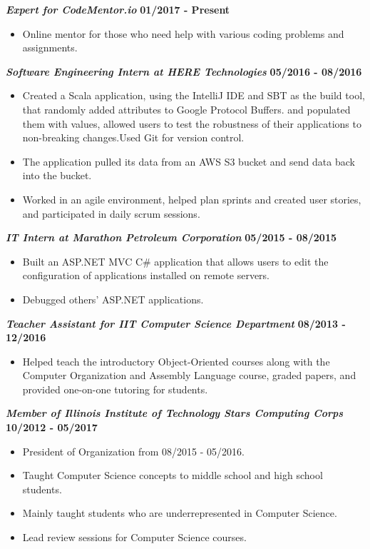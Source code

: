 \documentclass[10pt]{res}
\begin{document}
\begin{resume}
\textbf{\textit{Expert for CodeMentor.io}}
	\vspace*{.25em}
	\hfill{\bf 01/2017 - Present}
	\begin{itemize}
		\item Online mentor for those who need help with various coding problems and assignments. 
	\end{itemize}
	
	\textbf{\textit{Software Engineering Intern at HERE Technologies}}
	\vspace*{.25em}
	\hfill {\bf 05/2016 - 08/2016}
	\begin{itemize}
	  \item Created a Scala application, using the IntelliJ IDE and SBT as the build tool, that randomly added attributes to Google Protocol Buffers. 
 and populated them with values, allowed users to test the robustness of their applications to non-breaking changes.Used Git for version control. 
	\item The application pulled its data from an AWS S3 bucket and send data back into the bucket.
\item Worked in an agile environment, helped plan sprints and created user stories, and participated in daily scrum sessions. 
	\end{itemize}  
	\textbf{\textit{IT Intern at Marathon Petroleum Corporation}} \hfill {\bf 05/2015 - 08/2015}
	\vspace*{.25em}
	\begin{itemize}
  \setlength\itemsep{0em}
	  \item Built an ASP.NET MVC C\# application that allows users to edit the configuration of applications installed on remote servers.
	  \item Debugged others' ASP.NET applications.
\end{itemize}

	\textbf{\textit{Teacher Assistant for IIT Computer Science Department}} 
	\vspace*{.25em}
	\hfill {\bf 08/2013 - 12/2016}
	\begin{itemize}
	  \item Helped teach the introductory Object-Oriented courses along with the Computer Organization and Assembly Language course, graded papers, and provided one-on-one tutoring for students. 
	\end{itemize}
	
	\textbf{\textit{Member of Illinois Institute of Technology Stars Computing Corps}}
	\vspace*{.25em}
	\hfill {\bf 10/2012 - 05/2017}
	\begin{itemize}
  \setlength\itemsep{0em}
	  \item President of Organization from 08/2015 - 05/2016.
	  \item Taught Computer Science concepts to middle school and high school students.  
	  \item Mainly taught students who are underrepresented in Computer Science.
	  \item Lead review sessions for Computer Science courses.
	\end{itemize}


\end{resume}
\end{document}
